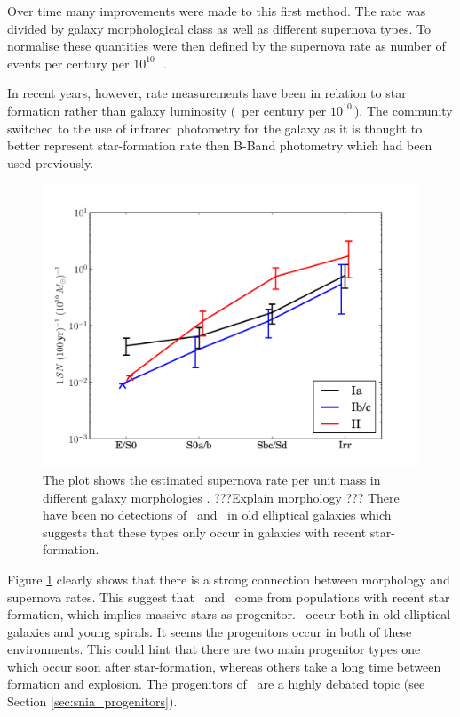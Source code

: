 Over time many improvements were made to this first method. The rate was divided by galaxy morphological class as well as different supernova types. To normalise these quantities were then defined by the supernova rate as number of events per century per $10^{10}$\,\lsun\ \citep[e.g.][]{1991ARA&A..29..363V,1994ApJS...92..487T}. 

In recent years, however, rate measurements have been in relation to star formation rather than galaxy luminosity (\sn\ per century per $10^{10}$\,\msun).  The community \citep[e.g.][]{2005A&A...433..807M} switched to the use of infrared photometry for the galaxy as it is thought to better represent star-formation rate then B-Band photometry \citep{2003A&A...410...83H} which had been used previously. 
\begin{figure}[htbp] %
   \centering
   \includegraphics[width=\textwidth]{chapter_intro/plots/snrates_mannucci05.pdf} 
   \caption{The plot shows the estimated supernova rate per unit mass in different galaxy morphologies \citep{2005A&A...433..807M}. ???Explain morphology ??? There have been no detections of \sneibc\ and \sneii\ in old elliptical galaxies which suggests that these types only occur in galaxies with recent star-formation.}
   \label{fig:snrates_mannucci05}
\end{figure}

Figure \ref{fig:snrates_mannucci05} clearly shows that there is a strong connection between morphology and supernova rates. This suggest that \sneii\ and \sneibc\ come from populations with recent star formation, which implies massive stars as progenitor. \sneia\ occur both in old elliptical galaxies and young spirals. It seems the progenitors occur in both of these environments. This could hint that there are two main progenitor types one which occur soon after star-formation, whereas others take a long time between formation and explosion. The progenitors of \sneia\ are a highly debated topic (see Section \ref{sec:snia_progenitors}).

